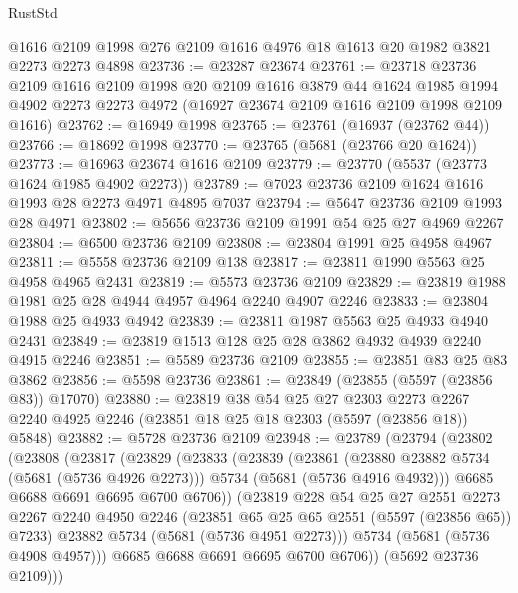 \begin{lexlean}{RustStd}
\begin{coremodule}
    @1616
    @2109
    @1998
    @276
    @2109
    @1616
    @4976
    @18
    @1613
    @20
    @1982
    @3821
    @2273
    @2273
    @4898
@23736 := @23287 @23674
@23761 := @23718
    @23736
    @2109
    @1616
    @2109
    @1998
    @20
    @2109
    @1616
    @3879
    @44
    @1624
    @1985
    @1994
    @4902
    @2273
    @2273
    @4972
    (@16927 @23674 @2109 @1616 @2109 @1998 @2109 @1616)
@23762 := @16949 @1998
@23765 := @23761 (@16937 (@23762 @44))
@23766 := @18692 @1998
@23770 := @23765 (@5681 (@23766 @20 @1624))
@23773 := @16963 @23674 @1616 @2109
@23779 := @23770 (@5537 (@23773 @1624 @1985 @4902 @2273))
@23789 := @7023 @23736 @2109 @1624 @1616 @1993 @28 @2273 @4971 @4895 @7037
@23794 := @5647 @23736 @2109 @1993 @28 @4971
@23802 := @5656 @23736 @2109 @1991 @54 @25 @27 @4969 @2267
@23804 := @6500 @23736 @2109
@23808 := @23804 @1991 @25 @4958 @4967
@23811 := @5558 @23736 @2109 @138
@23817 := @23811 @1990 @5563 @25 @4958 @4965 @2431
@23819 := @5573 @23736 @2109
@23829 := @23819 @1988 @1981 @25 @28 @4944 @4957 @4964 @2240 @4907 @2246
@23833 := @23804 @1988 @25 @4933 @4942
@23839 := @23811 @1987 @5563 @25 @4933 @4940 @2431
@23849 := @23819 @1513 @128 @25 @28 @3862 @4932 @4939 @2240 @4915 @2246
@23851 := @5589 @23736 @2109
@23855 := @23851 @83 @25 @83 @3862
@23856 := @5598 @23736
@23861 := @23849 (@23855 (@5597 (@23856 @83)) @17070)
@23880 := @23819
    @38
    @54
    @25
    @27
    @2303
    @2273
    @2267
    @2240
    @4925
    @2246
    (@23851 @18 @25 @18 @2303 (@5597 (@23856 @18)) @5848)
@23882 := @5728 @23736 @2109
@23948 := @23789
    (@23794
      (@23802
        (@23808
          (@23817
            (@23829
              (@23833
                (@23839
                  (@23861
                    (@23880 @23882 @5734 (@5681 (@5736 @4926 @2273)))
                    @5734
                    (@5681 (@5736 @4916 @4932)))
                  @6685
                  @6688
                  @6691
                  @6695
                  @6700
                  @6706))
              (@23819
                @228
                @54
                @25
                @27
                @2551
                @2273
                @2267
                @2240
                @4950
                @2246
                (@23851 @65 @25 @65 @2551 (@5597 (@23856 @65)) @7233)
                @23882
                @5734
                (@5681 (@5736 @4951 @2273)))
              @5734
              (@5681 (@5736 @4908 @4957)))
            @6685
            @6688
            @6691
            @6695
            @6700
            @6706))
        (@5692 @23736 @2109)))

\end{coremodule}
\end{lexlean}
